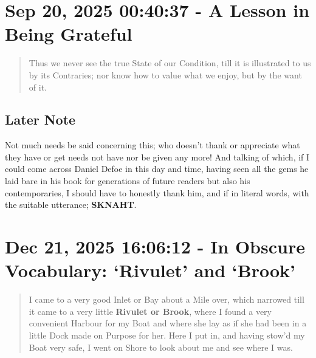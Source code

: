 \documentclass[a4paper]{article}
\begin{document}
\section{Sep 20, 2025 00:40:37 - A Lesson in Being Grateful}
\label{SEC31}



\noindent
\begin{minipage}{1\textwidth}
\vspace{1em}
\begin{quotation}
{\ttfamily


Thus we never see the true State of our Condition, till it is illustrated to us by its Contraries; nor know how to value what we enjoy, but by the want of it.

}
\end{quotation}
\vspace{1em}
\end{minipage}


\subsection{Later Note}

Not much needs be said concerning this; who doesn't thank or appreciate what they have or get needs not have nor be given any more! And talking of which, if I could come across Daniel Defoe in this day and time, having seen all the gems he laid bare in his book for generations of future readers but also his contemporaries, I should have to honestly thank him, and if in literal words, with the suitable utterance; {\Large \textbf{SKNAHT}}.




\section{Dec 21, 2025 16:06:12 - In Obscure Vocabulary: `Rivulet' and `Brook'}
\label{SEC32}



\noindent
\begin{minipage}{1\textwidth}
\vspace{1em}
\begin{quotation}
{\ttfamily

I came to a very good Inlet or Bay about a Mile over, which narrowed till it came to a very little \textbf{Rivulet or Brook}, where I found a very convenient Harbour for my Boat and where she lay as if she had been in a little Dock made on Purpose for her. Here I put in, and having stow’d my Boat very safe, I went on Shore to look about me and see where I was.

}
\end{quotation}
\vspace{1em}
\end{minipage}
\end{document}
